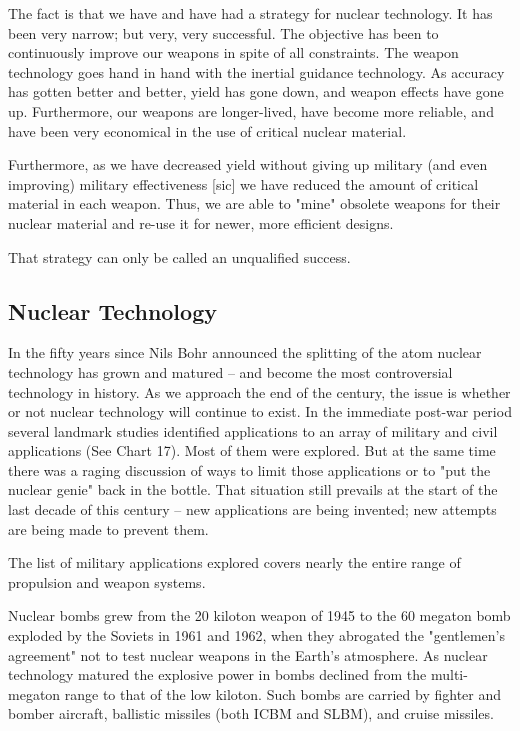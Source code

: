 The fact is that we have and have had a strategy for nuclear technology. It has been very narrow; but very, very successful. The objective has been to continuously improve our weapons in spite of all constraints. The weapon technology goes hand in hand with the inertial guidance technology. As accuracy has gotten better and better, yield has gone down, and weapon effects have gone up. Furthermore, our weapons are longer-lived, have become more reliable, and have been very economical in the use of critical nuclear material.

Furthermore, as we have decreased yield without giving up military (and even improving) military effectiveness [sic] we have reduced the amount of critical material in each weapon. Thus, we are able to "mine" obsolete weapons for their nuclear material and re-use it for newer, more efficient designs.

That strategy can only be called an unqualified success.

\subsection{Nuclear Technology}
In the fifty years since Nils Bohr announced the splitting of the atom nuclear technology has grown and matured -- and become the most controversial technology in history. As we approach the end of the century, the issue is whether or not nuclear technology will continue to exist. In the immediate post-war period several landmark studies identified applications to an array of military and civil applications (See Chart 17). Most of them were explored. But at the same time there was a raging discussion of ways to limit those applications or to "put the nuclear genie" back in the bottle. That situation still prevails at the start of the last decade of this century -- new applications are being invented; new attempts are being made to prevent them.

The list of military applications explored covers nearly the entire range of propulsion and weapon systems.

Nuclear bombs grew from the 20 kiloton weapon of 1945 to the 60 megaton bomb exploded by the Soviets in 1961 and 1962, when they abrogated the "gentlemen's agreement" not to test nuclear weapons in the Earth's atmosphere. As nuclear technology matured the explosive power in bombs declined from the multi-megaton range to that of the low kiloton. Such bombs are carried by fighter and bomber aircraft, ballistic missiles (both ICBM and SLBM), and cruise missiles.

